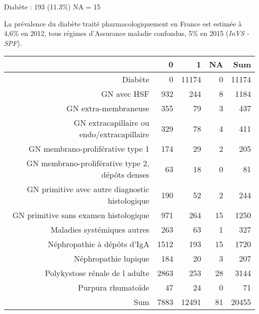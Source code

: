 \documentclass[11pt,a4paper]{article}\usepackage[]{graphicx}\usepackage[]{color}
\begin{document}
Diabète : 193 (11.3\%) NA = 15

La prévalence du diabète traité pharmacologiquement en France est estimée à 4,6\% en 2012, tous régimes d’Assurance maladie confondus, 5\% en 2015 (\textit{InVS - SPF}).

\begin{table}[ht]
\centering
\begin{tabular}{rrrrr}
  \hline
 & 0 & 1 & NA & Sum \\ 
  \hline
Diabète & 0 & 11174 & 0 & 11174 \\ 
  GN avec HSF & 932 & 244 & 8 & 1184 \\ 
  GN extra-membraneuse & 355 & 79 & 3 & 437 \\ 
  GN extracapillaire ou endo/extracapillaire & 329 & 78 & 4 & 411 \\ 
  GN membrano-proliférative type 1 & 174 & 29 & 2 & 205 \\ 
  GN membrano-proliférative type 2, dépôts denses & 63 & 18 & 0 & 81 \\ 
  GN primitive avec autre diagnostic histologique & 190 & 52 & 2 & 244 \\ 
  GN primitive sans examen histologique & 971 & 264 & 15 & 1250 \\ 
  Maladies systémiques autres & 263 & 63 & 1 & 327 \\ 
  Néphropathie à dépôts d'IgA & 1512 & 193 & 15 & 1720 \\ 
  Néphropathie lupique & 184 & 20 & 3 & 207 \\ 
  Polykystose rénale de l adulte & 2863 & 253 & 28 & 3144 \\ 
  Purpura rhumatoïde & 47 & 24 & 0 & 71 \\ 
  Sum & 7883 & 12491 & 81 & 20455 \\ 
   \hline
\end{tabular}
\end{table}
\end{document}

